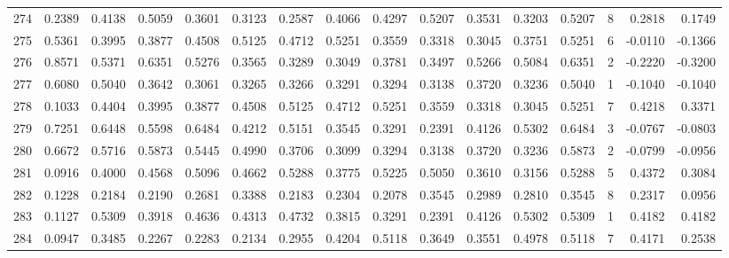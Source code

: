 \begin{tabular}{lrrrrrrrrrrrrrrr}
274 &      0.2389 &  0.4138 &  0.5059 &  0.3601 &  0.3123 &  0.2587 &  0.4066 &  0.4297 &  0.5207 &  0.3531 &   0.3203 &     0.5207 &      8 &                    0.2818 &                     0.1749 \\
275 &      0.5361 &  0.3995 &  0.3877 &  0.4508 &  0.5125 &  0.4712 &  0.5251 &  0.3559 &  0.3318 &  0.3045 &   0.3751 &     0.5251 &      6 &                   -0.0110 &                    -0.1366 \\
276 &      0.8571 &  0.5371 &  0.6351 &  0.5276 &  0.3565 &  0.3289 &  0.3049 &  0.3781 &  0.3497 &  0.5266 &   0.5084 &     0.6351 &      2 &                   -0.2220 &                    -0.3200 \\
277 &      0.6080 &  0.5040 &  0.3642 &  0.3061 &  0.3265 &  0.3266 &  0.3291 &  0.3294 &  0.3138 &  0.3720 &   0.3236 &     0.5040 &      1 &                   -0.1040 &                    -0.1040 \\
278 &      0.1033 &  0.4404 &  0.3995 &  0.3877 &  0.4508 &  0.5125 &  0.4712 &  0.5251 &  0.3559 &  0.3318 &   0.3045 &     0.5251 &      7 &                    0.4218 &                     0.3371 \\
279 &      0.7251 &  0.6448 &  0.5598 &  0.6484 &  0.4212 &  0.5151 &  0.3545 &  0.3291 &  0.2391 &  0.4126 &   0.5302 &     0.6484 &      3 &                   -0.0767 &                    -0.0803 \\
280 &      0.6672 &  0.5716 &  0.5873 &  0.5445 &  0.4990 &  0.3706 &  0.3099 &  0.3294 &  0.3138 &  0.3720 &   0.3236 &     0.5873 &      2 &                   -0.0799 &                    -0.0956 \\
281 &      0.0916 &  0.4000 &  0.4568 &  0.5096 &  0.4662 &  0.5288 &  0.3775 &  0.5225 &  0.5050 &  0.3610 &   0.3156 &     0.5288 &      5 &                    0.4372 &                     0.3084 \\
282 &      0.1228 &  0.2184 &  0.2190 &  0.2681 &  0.3388 &  0.2183 &  0.2304 &  0.2078 &  0.3545 &  0.2989 &   0.2810 &     0.3545 &      8 &                    0.2317 &                     0.0956 \\
283 &      0.1127 &  0.5309 &  0.3918 &  0.4636 &  0.4313 &  0.4732 &  0.3815 &  0.3291 &  0.2391 &  0.4126 &   0.5302 &     0.5309 &      1 &                    0.4182 &                     0.4182 \\
284 &      0.0947 &  0.3485 &  0.2267 &  0.2283 &  0.2134 &  0.2955 &  0.4204 &  0.5118 &  0.3649 &  0.3551 &   0.4978 &     0.5118 &      7 &                    0.4171 &                     0.2538 \\

\end{tabular}

